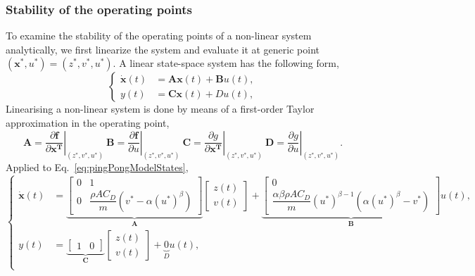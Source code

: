 \documentclass[10pt,twoside,openright]{article}
\begin{document}
\subsubsection{Stability of the operating points}\label{section:stability}
To examine the stability of the operating points of a non-linear system analytically, we first linearize the system and evaluate it at generic point $(\bm{x^*}, u^*) = (z^*, v^*, u^*)$. A linear state-space system has the following form,
\begin{equation}
\begin{cases}
\bm{\dot{x}}(t) &= \bm{A} \bm{x}(t) + \bm{B} u(t), \\
y(t) &= \bm{C} \bm{x}(t) + D u(t),
\end{cases}
\end{equation}
Linearising a non-linear system is done by means of a first-order Taylor approximation in the operating point,
\begin{equation}
\bm{A} = \left. \dfrac{\partial \bm{f}}{\partial \bm{x^T}}\right|_{(z^*, v^*, u^*)} ~ \bm{B} = \left. \dfrac{\partial \bm{f}}{\partial u}\right|_{(z^*, v^*,u^*)} ~ \bm{C} = \left. \dfrac{\partial g}{\partial \bm{x^T}}\right|_{(z^*, v^*, u^*)} ~ \bm{D} = \left. \dfrac{\partial g}{\partial u}\right|_{(z^*, v^*, u^*)}.
\end{equation}
Applied to Eq.~\ref{eq:pingPongModelStates},
\begin{equation}\label{eq:linearised_system}
\begin{cases}
\bm{\dot{x}}(t) &=
\underbrace{
\begin{bmatrix}
0 & 1 \\
0 & \dfrac{\rho A C_D}{m} \left( v^* - \alpha \left( u^* \right)^\beta \right)
\end{bmatrix}}_{\bm{A}}
\begin{bmatrix}
z(t) \\
v(t)
\end{bmatrix}
+
\underbrace{
\begin{bmatrix}
0 \\
\dfrac{\alpha \beta \rho A C_D}{m} (u^*)^{\beta-1} \left(\alpha (u^*)^\beta - v^* \right)
\end{bmatrix}}_{\bm{B}}
u(t), \\
y(t) &=
\underbrace{
\begin{bmatrix}
1 & 0
\end{bmatrix}}_{\bm{C}}
\begin{bmatrix}
z(t) \\
v(t)
\end{bmatrix}
+
\underbrace{0}_{D} u(t), \\
\end{cases}
\end{equation}
\end{document}
